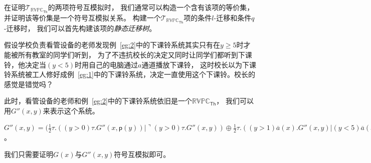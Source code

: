 在证明$\mathcal{T}_{\mathbb{RVPC}_{\mathsf{Th}}}$的两项符号互模拟时，
我们通常可以构造一个含有该项的等价集，并证明该等价集是一个符号互模拟关系。
构建一个$\mathcal{T}_{\mathbb{RVPC}_{\mathsf{Th}}}$项的条件$l$-迁移和条件$q$-迁移时，
我们可以首先构建该项的\textit{静态迁移树}。

\begin{example}\label{eg:5}
   假设学校负责看管设备的老师发现例~\ref{eg:2}中的下课铃系统其实只有在$y\geq 5$时才能被所有教室的同学们听到，
   为了不违抗校长的决定又同时让同学们都听到下课铃，他决定当$(y<5)$时用自己的电脑通过$a$通道播放下课铃，
   这时校长以为下课铃系统被工人修好成例~\ref{eg:1}中的下课铃系统，决定一直使用这个下课铃。校长的感觉是错觉吗？

   此时，看管设备的老师和例~\ref{eg:2}中的下课铃系统依旧是一个$\mathbb{RVPC}_{\mathsf{Th}}$，
   我们可以用$G''(x,y)$来表示这个系统。

   $G''(x,y) = (\frac{1}{2}\tau.((y>0)\tau.G''(x,\mathsf{p}(y))|\urcorner (y>0)\tau.G''(x,y))\oplus \frac{1}{2}\tau.((y>1)\overline{a}(x).G''(x,y)|(y<5)\overline{a}(x).G''(x,y))$。

   我们只需要证明$G(x)$与$G''(x,y)$符号互模拟即可。
\end{example}
